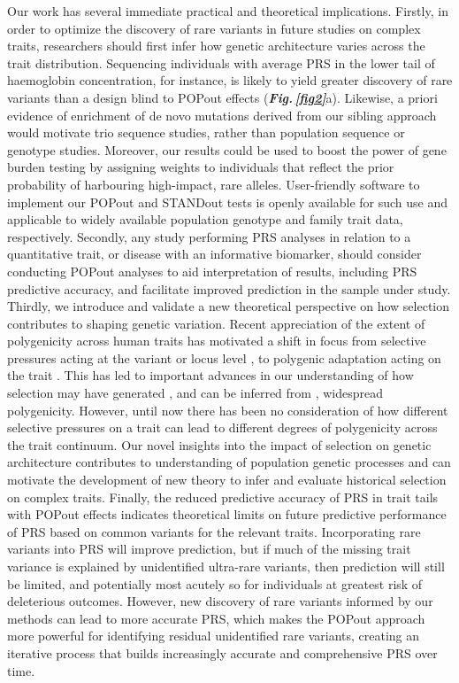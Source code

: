 \documentclass[12pt]{zHenriquesLab-StyleBioRxiv}
\newcommand\fref[1]{\normalsize{\textbf{\textit{Fig.\,\ref{#1}}}}\normalsize{}}
\begin{document}
Our work has several immediate practical and theoretical implications. 
Firstly, in order to optimize the discovery of rare variants in future 
studies on complex traits, researchers should first infer how genetic 
architecture varies across the trait distribution. 
Sequencing individuals with average PRS in the lower tail of 
haemoglobin concentration, for instance, is likely to yield greater 
discovery of rare variants than a design blind to POPout 
effects (\fref{fig2}{a}). Likewise, a priori evidence of enrichment of de 
novo mutations derived from our sibling approach \cite{Souaiaia2024} 
would motivate trio sequence studies, rather than population 
sequence or genotype studies. Moreover, our results could be 
used to boost the power of gene burden testing \cite{Lee2012}
by assigning weights to individuals that reflect the prior probability 
of harbouring high-impact, rare alleles. User-friendly software 
to implement our POPout and STANDout tests is openly available 
for such use and applicable to widely available population 
genotype and family trait data, respectively. Secondly, 
any study performing PRS analyses in relation to a quantitative trait, 
or disease with an informative biomarker, should consider 
conducting POPout analyses to aid interpretation of results, 
including PRS predictive accuracy, and facilitate improved prediction 
in the sample under study. Thirdly, we introduce and validate a new 
theoretical perspective on how selection contributes 
to shaping genetic variation. Recent appreciation of the extent 
of polygenicity across human traits has motivated a shift 
in focus from selective pressures acting at the 
variant or locus level \cite{Sabeti2002,Paul2008}, 
to polygenic adaptation acting on the trait \cite{Pritchard2010,Hollinger2019}. 
This has led to important advances in our understanding 
of how selection may have generated \cite{Oconnor2019}, 
and can be inferred from \cite{Barghi2020}, 
widespread polygenicity. However, until now there has been 
no consideration of how different selective pressures on a trait 
can lead to different degrees of polygenicity across the trait continuum. 
Our novel insights into the impact of selection on genetic architecture 
contributes to understanding of population genetic processes and can motivate 
the development of new theory to infer and evaluate historical selection on complex traits. 
Finally, the reduced predictive accuracy of PRS in trait tails 
with POPout effects indicates theoretical limits on future predictive 
performance of PRS based on common variants for the relevant traits. 
Incorporating rare variants into PRS will improve prediction, but if much of 
the missing trait variance is explained by unidentified ultra-rare variants, 
then prediction will still be limited, and potentially most acutely 
so for individuals at greatest risk of deleterious outcomes. 
However, new discovery of rare variants informed by our methods can lead 
to more accurate PRS, which makes the POPout approach more powerful for 
identifying residual unidentified rare variants, creating an iterative 
process that builds increasingly accurate and comprehensive PRS over time.
\end{document}
